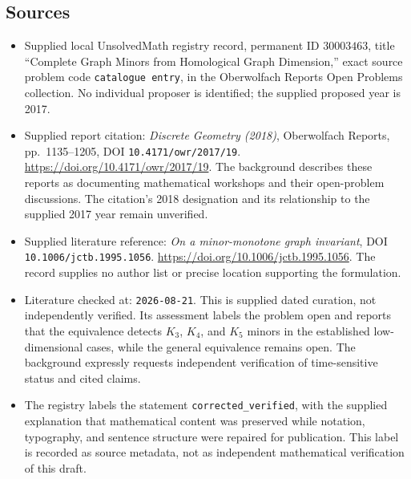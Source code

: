 \documentclass[11pt]{article}
\begin{document}
\subsection{Sources}
\begin{itemize}
\item Supplied local UnsolvedMath registry record, permanent ID \(30003463\), title ``Complete Graph Minors from Homological Graph Dimension,'' exact source problem code \texttt{catalogue entry}, in the Oberwolfach Reports Open Problems collection. No individual proposer is identified; the supplied proposed year is 2017.
\item Supplied report citation: \emph{Discrete Geometry (2018)}, Oberwolfach Reports, pp.~1135--1205, DOI \texttt{10.4171/owr/2017/19}. \url{https://doi.org/10.4171/owr/2017/19}. The background describes these reports as documenting mathematical workshops and their open-problem discussions. The citation's 2018 designation and its relationship to the supplied 2017 year remain unverified.
\item Supplied literature reference: \emph{On a minor-monotone graph invariant}, DOI \texttt{10.1006/jctb.1995.1056}. \url{https://doi.org/10.1006/jctb.1995.1056}. The record supplies no author list or precise location supporting the formulation.
\item Literature checked at: \texttt{2026-08-21}. This is supplied dated curation, not independently verified. Its assessment labels the problem open and reports that the equivalence detects \(K_3\), \(K_4\), and \(K_5\) minors in the established low-dimensional cases, while the general equivalence remains open. The background expressly requests independent verification of time-sensitive status and cited claims.
\item The registry labels the statement \texttt{corrected\_verified}, with the supplied explanation that mathematical content was preserved while notation, typography, and sentence structure were repaired for publication. This label is recorded as source metadata, not as independent mathematical verification of this draft.
\end{itemize}
\end{document}
